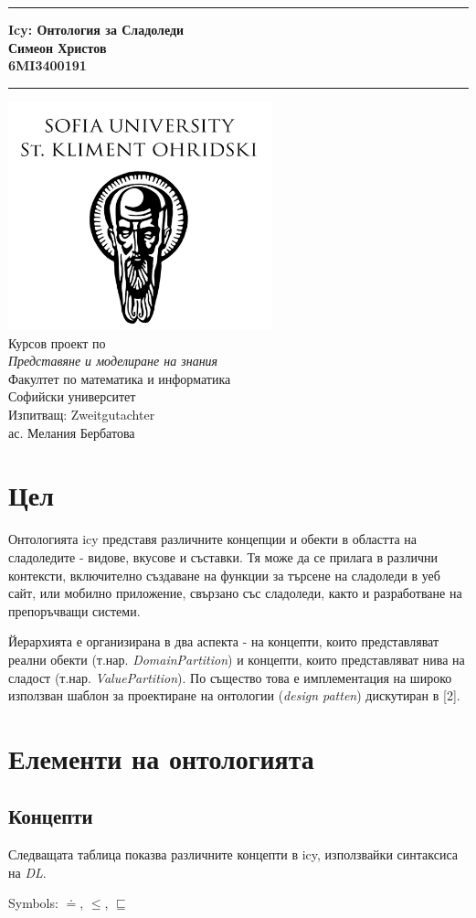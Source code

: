 \documentclass[12pt]{article}
\newcommand{\JMUTitle}[9]{

  \thispagestyle{empty}
  \vspace*{\stretch{1}}
  {\parindent0cm
  \rule{\linewidth}{.7ex}}
  \begin{flushright}
    \vspace*{\stretch{1}}
    \sffamily\bfseries\Huge
    #1\\
    \vspace*{\stretch{1}}
    \sffamily\bfseries\large
    #2\\
    \vspace*{\stretch{1}}
    \sffamily\bfseries\small
    #3
  \end{flushright}
  \rule{\linewidth}{.7ex}

  \vspace*{\stretch{1}}
  \begin{center}
    \includegraphics[width=3in]{./images/logo.png} \\
    \vspace*{\stretch{1}}
    \Large Курсов проект по \\ \textit{Представяне и моделиране на знания} \\

    \vspace*{\stretch{2}}
    \large Факултет по математика и информатика\\
    \large Софийски университет\\
    
    \vspace*{\stretch{1}}
    \large Изпитващ:  #8 \\[1mm]
    
    \vspace*{\stretch{1}}
    \large #7 \\

  \end{center}
}
\begin{document}
  

  \JMUTitle
      {Icy: Онтология за Сладоледи}
      {Симеон Христов}
      {6MI3400191}
      
      {Wirtschaftswissenschaftlichen Fakultät}  %
      {W"urzburg 2018}                          %
      {Януари 2023}                              %
      {ас. Мелания Бербатова}               %
      {Zweitgutachter}                          %

  \clearpage

\tableofcontents

\clearpage


\section{Цел} 

    Онтологията icy представя различните концепции и обекти в областта на сладоледите - видове, вкусове и съставки. Тя може да се прилага в различни контексти, включително създаване на
    функции за търсене на сладоледи в уеб сайт, или мобилно приложение, свързано със
    сладоледи, както и разработване на препоръчващи системи.
    
    \vspace{1em}
    
    Йерархията е организирана в два аспекта - на концепти, които представляват реални обекти (т.нар. \textit{DomainPartition}) и концепти, които представляват нива на сладост (т.нар. \textit{ValuePartition}). По същество това е имплементация на широко използван шаблон за проектиране на онтологии (\textit{design patten}) дискутиран в [2].


\section{Елементи на онтологията}

    \subsection{Концепти}
        
        Следващата таблица показва различните концепти в icy, използвайки синтаксиса на \textit{DL}.

        Symbols: $\doteq$, $\leq$, $\sqsubseteq$
\end{document}
